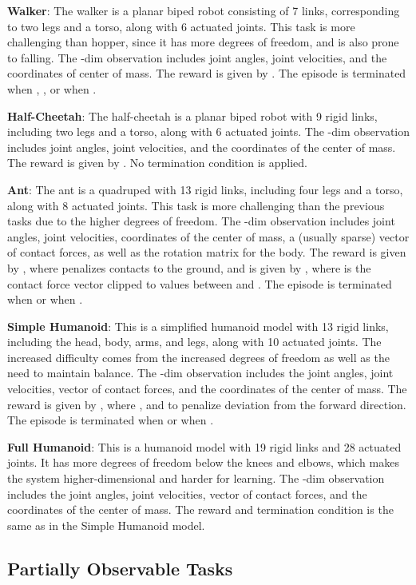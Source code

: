 \documentclass{article}
\begin{document}
{\bf Walker}: The walker is a planar biped robot consisting of 7 links, corresponding to two legs and a torso, along with 6 actuated joints. This task is more challenging than hopper, since it has more degrees of freedom, and is also prone to falling. The -dim observation includes joint angles, joint velocities, and the coordinates of center of mass. The reward is given by
.
The episode is terminated when , , or when .

{\bf Half-Cheetah}: The half-cheetah is a planar biped robot with  9 rigid links, including two legs and a torso, along with 6 actuated joints. The -dim observation includes joint angles, joint velocities, and the coordinates of the center of mass. The reward is given by
.
No termination condition is applied.

{\bf Ant}: The ant is a quadruped with 13 rigid links, including four legs and a torso, along with 8 actuated joints. This task is more challenging than the previous tasks due to the higher degrees of freedom. The -dim observation includes joint angles, joint velocities, coordinates of the center of mass, a (usually sparse) vector of contact forces, as well as the rotation matrix for the body. The reward is given by , where  penalizes contacts to the ground, and is given by
, where  is the contact force vector clipped to values between  and . The episode is terminated when  or when .

{\bf Simple Humanoid}: This is a simplified humanoid model with 13 rigid links, including the head, body, arms, and legs, along with 10 actuated joints. The increased difficulty comes from the increased degrees of freedom as well as the need to maintain balance. The -dim observation includes the joint angles, joint velocities, vector of contact forces, and the coordinates of the center of mass. The reward is given by
, where , and  to penalize deviation from the forward direction. The episode is terminated when  or when .

{\bf Full Humanoid}: This is a humanoid model with 19 rigid links and 28 actuated joints. It has more degrees of freedom below the knees and elbows, which makes the system higher-dimensional and harder for learning. The -dim observation includes the joint angles, joint velocities, vector of contact forces, and the coordinates of the center of mass. The reward and termination condition is the same as in the Simple Humanoid model.

\subsection{Partially Observable Tasks}
\end{document}
